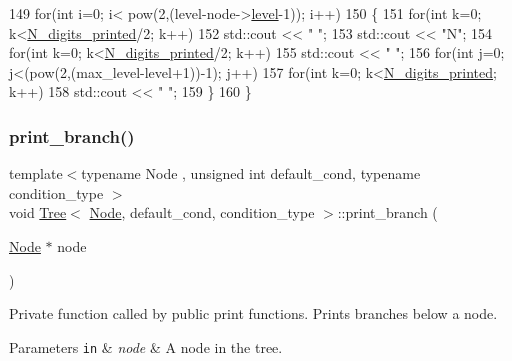 \begin{DoxyCode}
149         \textcolor{keywordflow}{for}(\textcolor{keywordtype}{int} i=0; i< pow(2,(level-node->\hyperlink{struct_node_a64a379c6dd2c75ade9687670c517b7e7}{level}-1)); i++)
150         \{
151             \textcolor{keywordflow}{for}(\textcolor{keywordtype}{int} k=0; k<\hyperlink{class_tree_ad24ef7cae6a7c0226280cf56bbc25f53}{N\_digits\_printed}/2; k++)
152                 std::cout << \textcolor{stringliteral}{" "};
153             std::cout << \textcolor{stringliteral}{"N"};
154             \textcolor{keywordflow}{for}(\textcolor{keywordtype}{int} k=0; k<\hyperlink{class_tree_ad24ef7cae6a7c0226280cf56bbc25f53}{N\_digits\_printed}/2; k++)
155                 std::cout << \textcolor{stringliteral}{" "};
156             \textcolor{keywordflow}{for}(\textcolor{keywordtype}{int} j=0; j<(pow(2,(max\_level-level+1))-1); j++)
157                 \textcolor{keywordflow}{for}(\textcolor{keywordtype}{int} k=0; k<\hyperlink{class_tree_ad24ef7cae6a7c0226280cf56bbc25f53}{N\_digits\_printed}; k++)
158                     std::cout << \textcolor{stringliteral}{" "};
159         \}
160 \}
\end{DoxyCode}
\mbox{\label{class_tree_a2fb927c8da9d55f28039b407b101ac28}} 
\subsubsection{\texorpdfstring{print\+\_\+branch()}{print\_branch()}}
{\footnotesize\ttfamily template$<$typename Node , unsigned int default\+\_\+cond, typename condition\+\_\+type $>$ \\
void \hyperlink{class_tree}{Tree}$<$ \hyperlink{struct_node}{Node}, default\+\_\+cond, condition\+\_\+type $>$\+::print\+\_\+branch (\begin{DoxyParamCaption}\item[{\hyperlink{struct_node}{Node} $\ast$}]{node }\end{DoxyParamCaption})\hspace{0.3cm}{\ttfamily [private]}}

Private function called by public print functions. Prints branches below a node. 
\begin{DoxyParams}[1]{Parameters}
\mbox{\tt in}  & {\em node} & A node in the tree. \\
\hline
\end{DoxyParams}

